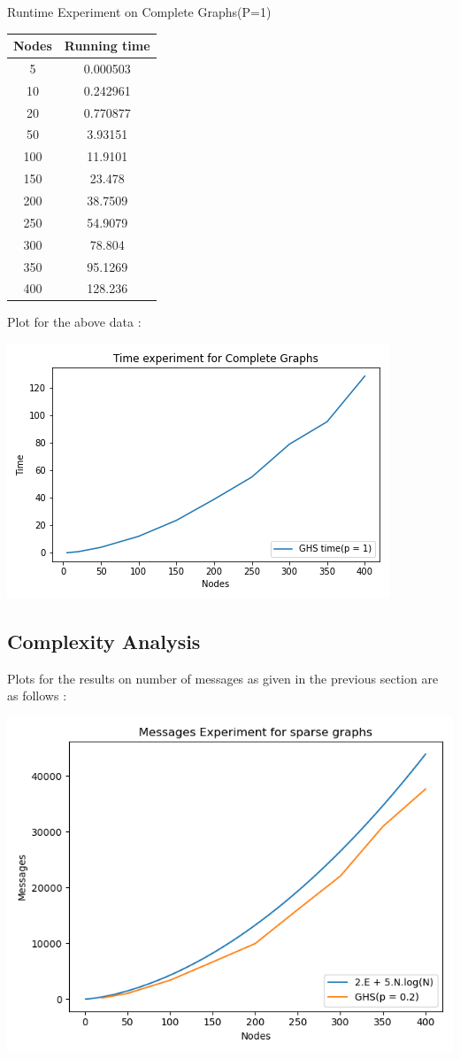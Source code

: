 \documentclass[letterpaper,11pt]{article}
\begin{document}
	\begin{center}
		Runtime Experiment on Complete Graphs(P=1) \\ 
		\begin{tabular}{|c|c|}
			\hline 
			{\bf Nodes}  & {\bf Running time} \\
			\hline 
      		5   & 0.000503 \\
			\hline 
     		10  & 0.242961 \\
			\hline 
      		20  & 0.770877 \\ 
			\hline 
			50  & 3.93151  \\
			\hline 
			100 & 11.9101  \\
			\hline 
			150 & 23.478  \\
			\hline 
			200 & 38.7509 \\
			\hline 
			250 & 54.9079 \\
			\hline 
			300 & 78.804  \\
			\hline 
			350 & 95.1269  \\
			\hline 
			400 & 128.236  \\
			\hline 
		\end{tabular}
	\end{center} 
	
	Plot for the above data : 
	
	\includegraphics{time}
	
	\subsection{Complexity Analysis}
	
	Plots for the results on number of messages as given in the previous section are as follows : 
	
	\includegraphics[width = 0.7 \textwidth]{sparse}
	
\end{document}
